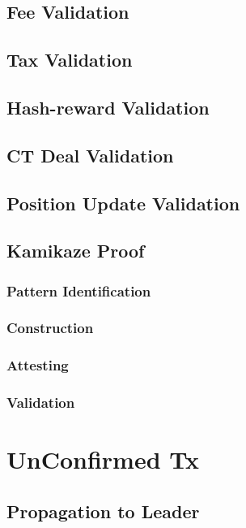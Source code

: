 \documentclass[a4paper,11pt]{article}
\begin{document}
\subsection{Fee Validation}

\subsection{Tax Validation}

\subsection{Hash-reward Validation}

\subsection{CT Deal Validation}

\subsection{Position Update Validation}

\subsection{Kamikaze Proof}

\subsubsection{Pattern Identification}

\subsubsection{Construction}

\subsubsection{Attesting}

\subsubsection{Validation}

\section{UnConfirmed Tx}

\subsection{Propagation to Leader}
\end{document}
